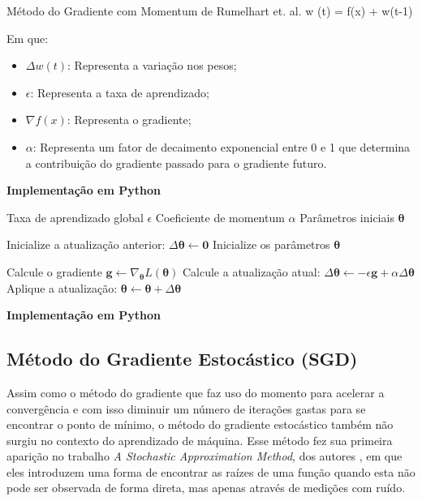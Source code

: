 \begin{equacaodestaque}{Método do Gradiente com Momentum de Rumelhart et. al.}
        \Delta w (t) = \epsilon \nabla f(x) + \alpha \Delta w(t-1)
    \label{eq:metodo-do-gradiente-com-momentum-da-retropropagacao}
\end{equacaodestaque}

Em que:

\begin{itemize}
    \item $\Delta w(t)$: Representa a variação nos pesos;
    \item $\epsilon$: Representa a taxa de aprendizado;
    \item $\nabla f(x)$: Representa o gradiente;
    \item $\alpha$: Representa um fator de decaimento exponencial entre 0 e 1 que determina a contribuição do gradiente passado para o gradiente futuro.
\end{itemize}

\textbf{Implementação em Python}

\begin{algorithm}[H]
\caption{O Método do Gradiente com Momentum (versão de Rumelhart et al.)}
\label{alg:momentum_rumelhart}
\begin{algorithmic}[1]
\Require Taxa de aprendizado global $\epsilon$
\Require Coeficiente de momentum $\alpha$
\Require Parâmetros iniciais $\boldsymbol{\theta}$

\State Inicialize a atualização anterior: $\Delta\boldsymbol{\theta} \gets \mathbf{0}$
\State Inicialize os parâmetros $\boldsymbol{\theta}$

    \State Calcule o gradiente $\mathbf{g} \gets \nabla_{\boldsymbol{\theta}} L(\boldsymbol{\theta})$
    \State Calcule a atualização atual: $\Delta\boldsymbol{\theta} \gets -\epsilon \mathbf{g} + \alpha \Delta\boldsymbol{\theta}$
    \State Aplique a atualização: $\boldsymbol{\theta} \gets \boldsymbol{\theta} + \Delta\boldsymbol{\theta}$
\EndWhile
\end{algorithmic}
\end{algorithm}

\textbf{Implementação em Python}

\subsection{Método do Gradiente Estocástico (SGD)}

Assim como o método do gradiente que faz uso do momento para acelerar a convergência e com isso diminuir um número de iterações gastas para se encontrar o ponto de mínimo, o método do gradiente estocástico também não surgiu no contexto do aprendizado de máquina. Esse método fez sua primeira aparição no trabalho \textit{A Stochastic Approximation Method}, dos autores \textcite{StochasticGradientDescentMethod}, em que eles introduzem uma forma de encontrar as raízes de uma função quando esta não pode ser observada de forma direta, mas apenas através de medições com ruído.

